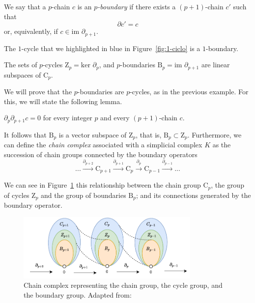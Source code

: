 \documentclass[../main.tex]{subfiles}
\begin{document}
\begin{definition}
\begin{sloppypar}
We say that a $p$-chain $c$ is an \emph{$p$-boundary} if there exists a $(p+1)$-chain $c'$ such that
\[
\partial c' = c
\]
or, equivalently, if $c \in \text{im }\partial_{p+1}$.
\end{sloppypar}
\end{definition}

\begin{exmp}
The $1$-cycle that we highlighted in blue in Figure~\ref{fig:1-ciclo} is a $1$-boundary.
\end{exmp}

\begin{remark}
The sets of $p$-cycles $\text{Z}_p = \text{ker }\partial_p$, and $p$-boundaries $\text{B}_p = \text{im }\partial_{p+1} $ are linear subspaces of $\text{C}_p$.
\end{remark}

We will prove that the $p$-boundaries are $p$-cycles, as in the previous example. For this, we will state the following lemma.

\begin{lemma}
$\partial_p \partial_{p+1} c = 0$ for every integer $p$ and every $(p + 1)$-chain $c$.
\end{lemma}

It follows that $\text{B}_p$ is a vector subspace of $\text{Z}_p$, that is, $\text{B}_p \subset \text{Z}_p$. Furthermore, we can define the \emph{chain complex} associated with a simplicial complex $K$ as the succession of chain groups connected by the boundary operators
\[
...\overset{\partial_{p+2}}{\longrightarrow}\text{C}_{p+1}\overset{\partial_{p+1}}{\longrightarrow}\text{C}_ {p}\overset{\partial_{p}}{\longrightarrow}\text{C}_{p-1}\overset{\partial_{p-1}}{\longrightarrow}...
\]

We can see in Figure~\ref{fig:gruposCadenasOpBorde} this relationship between the chain group $\text{C}_p$, the group of cycles $\text{Z}_p$ and the group of boundaries $\text{B}_p $; and its connections generated by the boundary operator.

\begin{figure}[!ht]
\centering
\includegraphics[width=0.8\textwidth]{figures/bg/chain_complex.pdf} 
\caption{Chain complex representing the chain group, the cycle group, and the boundary group. Adapted from: \cite{edelsbrunner_computational_2010}}
\label{fig:gruposCadenasOpBorde}
\end{figure}
\end{document}
